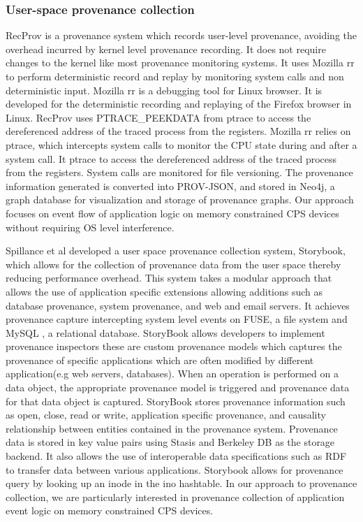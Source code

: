 \subsubsection{User-space provenance collection}
RecProv \cite{rec_prov} is a provenance system which records user-level provenance, avoiding the overhead incurred by kernel level provenance recording. It does not require changes to the kernel like most provenance monitoring systems. It uses Mozilla rr to perform deterministic record and replay by monitoring system calls  and non deterministic input. Mozilla rr is a debugging tool for Linux browser. It is developed for the deterministic recording and replaying of the Firefox browser in Linux. RecProv uses PTRACE\_PEEKDATA from ptrace to access the dereferenced address of the traced process from the registers. Mozilla rr relies on ptrace, which intercepts system calls to monitor the CPU state during and after a system call. It ptrace to access the dereferenced address of the traced process from the registers. System calls are monitored for file versioning. The provenance information generated is converted into PROV-JSON, and stored in Neo4j, a graph database for visualization and storage of provenance graphs. Our approach
focuses on event flow of application logic on memory constrained CPS devices without requiring OS level interference.


Spillance et al \cite{story} developed a user space provenance collection system, Storybook, which allows for the collection of provenance data from the user space thereby reducing performance overhead. This system takes a modular approach that allows the use of application specific extensions allowing additions such as database provenance, system provenance, and web and email servers. It achieves provenance capture intercepting system level events on FUSE, a file system and MySQL , a relational database. StoryBook allows developers to implement provenance inspectors these are custom provenance models which captures the provenance of specific applications which are often modified by different application(e.g web servers, databases). When an operation is performed on a data object, the appropriate provenance model is triggered and provenance data for that data object is captured. StoryBook stores provenance information such as open, close, read or write, application specific provenance, and causality relationship between entities contained in the provenance system. Provenance data is stored in key value pairs using Stasis and Berkeley DB as the storage backend. It also allows the use of interoperable data specifications such as RDF to transfer data between various applications. Storybook allows for provenance query by looking up an inode in the ino hashtable. In our approach to provenance collection, we are particularly interested in provenance collection of application event logic on memory constrained CPS devices.

